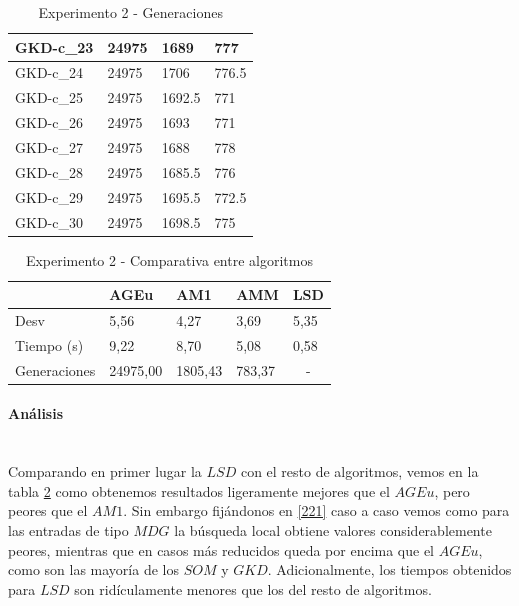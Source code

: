\documentclass[11pt,a4paper]{article}
\begin{document}
\begin{table}[H]
\begin{tabular}{l|l|l|l|}
			\multicolumn{1}{|l|}{GKD-c\_23} & 24975 & 1689   & 777   \\ \hline
			\multicolumn{1}{|l|}{GKD-c\_24} & 24975 & 1706   & 776.5 \\ \hline
			\multicolumn{1}{|l|}{GKD-c\_25} & 24975 & 1692.5 & 771   \\ \hline
			\multicolumn{1}{|l|}{GKD-c\_26} & 24975 & 1693   & 771   \\ \hline
			\multicolumn{1}{|l|}{GKD-c\_27} & 24975 & 1688   & 778   \\ \hline
			\multicolumn{1}{|l|}{GKD-c\_28} & 24975 & 1685.5 & 776   \\ \hline
			\multicolumn{1}{|l|}{GKD-c\_29} & 24975 & 1695.5 & 772.5 \\ \hline
			\multicolumn{1}{|l|}{GKD-c\_30} & 24975 & 1698.5 & 775   \\ \hline
		\end{tabular}
		\caption{ Experimento 2 - Generaciones }
		\label{223}
	\end{table}
	
	\begin{table}[H]
		\centering
		\begin{tabular}{l|l|l|l|l|}
			\cline{2-5}
			& AGEu     & AM1     & AMM    & LSD                    \\ \hline
			\multicolumn{1}{|l|}{Desv}         & 5,56     & 4,27    & 3,69   & 5,35                   \\ \hline
			\multicolumn{1}{|l|}{Tiempo (s)}   & 9,22     & 8,70    & 5,08   & 0,58                   \\ \hline
			\multicolumn{1}{|l|}{Generaciones} & 24975,00 & 1805,43 & 783,37 & \multicolumn{1}{c|}{-} \\ \hline
		\end{tabular}
		\caption{ Experimento 2 - Comparativa entre algoritmos }
		\label{224}
	\end{table}
	
	\paragraph{ Análisis } \ \\
	
	Comparando en primer lugar la $LSD$ con el resto de algoritmos, vemos en la tabla \ref{224} como obtenemos resultados ligeramente mejores que el $AGEu$, pero peores que el $AM1$. Sin embargo fijándonos en \ref{221} caso a caso vemos como para las entradas de tipo $MDG$ la búsqueda local obtiene valores considerablemente peores, mientras que en casos más reducidos queda por encima que el $AGEu$, como son las mayoría de los $SOM$ y $GKD$. Adicionalmente, los tiempos obtenidos para $LSD$ son ridículamente menores que los del resto de algoritmos. \\ 
	
\end{document}
